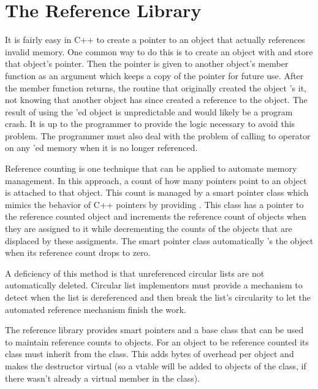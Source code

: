 
\chapter{The Reference Library}

It is fairly easy in C++ to create a pointer to an object that
actually references invalid memory.  One common way to do this
is to create an object with  and store that
object's pointer.  Then the pointer is given to another
object's member function as an argument which keeps a copy of
the pointer for future use.  After the member function
returns, the routine that originally created the object
's it, not knowing that another object has since
created a reference to the object.  The result of using the
'ed object is unpredictable and would likely be
a program crash.  It is up to the programmer to provide the
logic necessary to avoid this problem.  The programmer must
also deal with the problem of calling to 
operator on any 'ed memory when it is no longer
referenced.

Reference counting is one technique that can be applied to
automate memory management.  In this approach, a count of how
many pointers point to an object is attached to that object.
This count is managed by a smart pointer class which mimics
the behavior of C++ pointers by providing
.  This class has a pointer to the
reference counted object and increments the reference count of
objects when they are assigned to it while decrementing the
counts of the objects that are displaced by these assigments.
The smart pointer class automatically 's the
object when its reference count drops to zero.

A deficiency of this method is that unreferenced circular
lists are not automatically deleted.  Circular list
implementors must provide a mechanism to detect when the list
is dereferenced and then break the list's circularity to let
the automated reference mechanism finish the work.

The reference library provides smart pointers and a base class that
can be used to maintain reference counts to objects.  For an
object to be reference counted its class must inherit from
the  class.  This adds  bytes
of overhead per object and makes the destructor virtual (so a vtable
will be added to objects of the class, if there wasn't already a virtual
member in the class).

